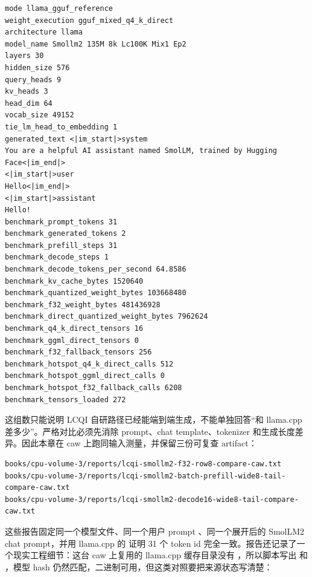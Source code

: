 \begin{lstlisting}[numbers=none,caption={LCQI 自研 SmolLM2/GGUF reference decode 证据}]
mode llama_gguf_reference
weight_execution gguf_mixed_q4_k_direct
architecture llama
model_name Smollm2 135M 8k Lc100K Mix1 Ep2
layers 30
hidden_size 576
query_heads 9
kv_heads 3
head_dim 64
vocab_size 49152
tie_lm_head_to_embedding 1
generated_text <|im_start|>system
You are a helpful AI assistant named SmolLM, trained by Hugging Face<|im_end|>
<|im_start|>user
Hello<|im_end|>
<|im_start|>assistant
Hello!
benchmark_prompt_tokens 31
benchmark_generated_tokens 2
benchmark_prefill_steps 31
benchmark_decode_steps 1
benchmark_decode_tokens_per_second 64.8586
benchmark_kv_cache_bytes 1520640
benchmark_quantized_weight_bytes 103668480
benchmark_f32_weight_bytes 481436928
benchmark_direct_quantized_weight_bytes 7962624
benchmark_q4_k_direct_tensors 16
benchmark_ggml_direct_tensors 0
benchmark_f32_fallback_tensors 256
benchmark_hotspot_q4_k_direct_calls 512
benchmark_hotspot_ggml_direct_calls 0
benchmark_hotspot_f32_fallback_calls 6208
benchmark_tensors_loaded 272
\end{lstlisting}

这组数只能说明 LCQI 自研路径已经能端到端生成，不能单独回答“和 llama.cpp 差多少”。严格对比必须先消除 prompt、chat template、tokenizer 和生成长度差异。因此本章在 caw 上跑同输入测量，并保留三份可复查 artifact：

\begin{lstlisting}[numbers=none,caption={同输入测量的历史 caw artifact}]
books/cpu-volume-3/reports/lcqi-smollm2-f32-row8-compare-caw.txt
books/cpu-volume-3/reports/lcqi-smollm2-batch-prefill-wide8-tail-compare-caw.txt
books/cpu-volume-3/reports/lcqi-smollm2-decode16-wide8-tail-compare-caw.txt
\end{lstlisting}

这些报告固定同一个模型文件、同一个用户 prompt 、同一个展开后的 SmolLM2 chat prompt，并用 llama.cpp 的  证明 31 个 token id 完全一致。报告还记录了一个现实工程细节：这台 caw 上复用的 llama.cpp 缓存目录没有 ，所以脚本写出  和 ，模型 hash 仍然匹配，二进制可用，但这类对照要把来源状态写清楚：

